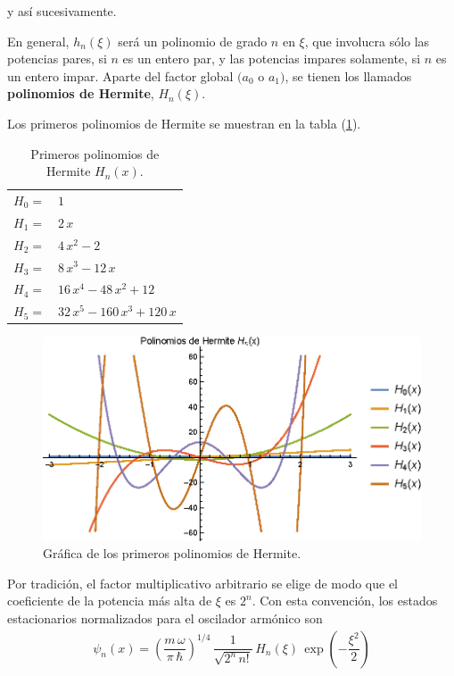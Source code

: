 y así sucesivamente.
\par
En general, $h_{n} (\xi)$ será un polinomio de grado $n$ en $\xi$, que involucra sólo las potencias pares, si $n$ es un entero par, y las potencias impares solamente, si $n$ es un entero impar. Aparte del factor global $(a_{0}$ o $a_{1})$, se tienen los llamados \textbf{polinomios de Hermite}, $H_{n} (\xi)$.
\par
Los primeros polinomios de Hermite se muestran en la tabla (\ref{tabla_001}).
\begin{table}[H]
\centering
\large
\begin{tabular}{l l}
$H_{0} =$ & $1$ \\
$H_{1} =$ & $2 \, x$ \\
$H_{2} =$ & $4 \, x^{2} - 2 $ \\
$H_{3} =$ & $8 \, x^{3} - 12 \, x$ \\
$H_{4} =$ & $16 \, x^{4} - 48 \, x^{2} + 12 $ \\
$H_{5} =$ & $32 \, x^{5} - 160 \, x^{3} + 120 \, x $
\end{tabular}
\caption{Primeros polinomios de Hermite $H_{n}(x)$.}
\label{tabla_001}
\end{table}

\begin{figure}[H]
    \centering
    \includegraphics[scale=1.3]{Imagenes/Plot_Hermite.eps}
    \caption{Gráfica de los primeros polinomios de Hermite.}
    \label{figura_003}
\end{figure}
Por tradición, el factor multiplicativo arbitrario se elige de modo que el coeficiente de la potencia más alta de $\xi$ es $2^{n}$. Con esta convención, los estados estacionarios normalizados para el oscilador armónico son
\begin{align}
\psi_{n} (x) = \left( \dfrac{m \, \omega}{\pi \, \hbar} \right)^{1/4} \, \dfrac{1}{\sqrt{2^{n} \, n!}} \, H_{n} (\xi) \, \exp \left( - \dfrac{\xi^{2}}{2} \right)
\label{eq:ecuacion_02_069}
\end{align}

